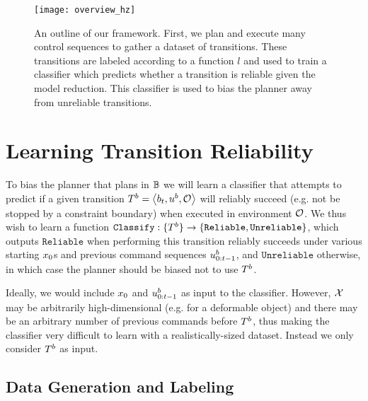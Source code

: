 \begin{figure}[h]
    \centering
    \texttt{[image: overview\_hz]}
    \caption{An outline of our framework. First, we plan and execute many control sequences to gather a dataset of transitions. These transitions are labeled according to a function $l$ and used to train a classifier which predicts whether a transition is reliable given the model reduction. This classifier is used to bias the planner away from unreliable transitions.}
    \label{fig:overview}
\end{figure}


\section{Learning Transition Reliability}

To bias the planner that plans in $\mathbb{B}$ we will learn a classifier that attempts to predict if a given transition $T^b = \left<b_t,u^b,\mathcal{O}\right>$ will reliably succeed (e.g. not be stopped by a constraint boundary) when executed in environment $\mathcal{O}$. We thus wish to learn a function 
$\texttt{Classify}:\{T^b\} \rightarrow \left\{\texttt{Reliable},\texttt{Unreliable}\right\}$, which outputs $\texttt{Reliable}$ when performing this transition reliably succeeds under various starting $x_0$s and previous command sequences $u^b_{0:t-1}$, and $\texttt{Unreliable}$ otherwise, in which case the planner should be biased not to use $T^b$.

Ideally, we would include $x_0$ and $u^b_{0:t-1}$ as input to the classifier. However, $\mathcal{X}$ may be arbitrarily high-dimensional (e.g. for a deformable object) and there may be an arbitrary number of previous commands before $T^b$, thus making the classifier very difficult to learn with a realistically-sized dataset. Instead we only consider $T^b$ as input.


\subsection{Data Generation and Labeling}


